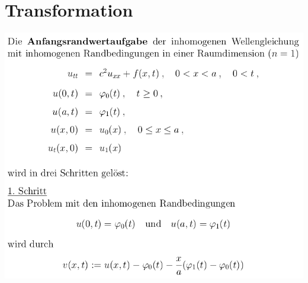 \documentclass[10pt,a4paper]{article}
\begin{document}
\section{Transformation}
\includegraphics[scale=0.3]{trafo}
\end{document}
